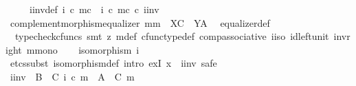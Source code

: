 \begin{isabellebody}
\ \ \ \ \ i{\isacharprime}{\kern0pt}{\isacharunderscore}{\kern0pt}inv{\isacharunderscore}{\kern0pt}def{\isacharcolon}{\kern0pt}\ {\isachardoublequoteopen}{\isacharparenleft}{\kern0pt}i\ {\isasymcirc}\isactrlsub c\ m{\isacharparenright}{\kern0pt}\isactrlsup c\ {\isacharequal}{\kern0pt}\ {\isacharparenleft}{\kern0pt}i\ {\isasymcirc}\isactrlsub c\ m\isactrlsup c{\isacharparenright}{\kern0pt}\ {\isasymcirc}\isactrlsub c\ i{\isacharprime}{\kern0pt}{\isacharunderscore}{\kern0pt}inv{\isachardoublequoteclose}\isanewline
\ \ \ \ \isamarkupfalse%
\ complement{\isacharunderscore}{\kern0pt}morphism{\isacharunderscore}{\kern0pt}equalizer{\isacharbrackleft}{\kern0pt}\ m{\isacharequal}{\kern0pt}{\isachardoublequoteopen}m{\isachardoublequoteclose}{\isacharcomma}{\kern0pt}\ \ X{\isacharequal}{\kern0pt}C{\isacharcomma}{\kern0pt}\ \ Y{\isacharequal}{\kern0pt}A{\isacharbrackright}{\kern0pt}\ \isamarkupfalse%
\ equalizer{\isacharunderscore}{\kern0pt}def\isanewline
\ \ \ \ \isamarkupfalse%
\ {\isacharparenleft}{\kern0pt}{\isacharminus}{\kern0pt}{\isacharcomma}{\kern0pt}\ typecheck{\isacharunderscore}{\kern0pt}cfuncs{\isacharcomma}{\kern0pt}\ smt\ {\isacharparenleft}{\kern0pt}z{}{\isacharparenright}{\kern0pt}\ {\isasymchi}m{\isacharunderscore}{\kern0pt}def\ cfunc{\isacharunderscore}{\kern0pt}type{\isacharunderscore}{\kern0pt}def\ comp{\isacharunderscore}{\kern0pt}associative{}\ i{\isacharunderscore}{\kern0pt}iso\ id{\isacharunderscore}{\kern0pt}left{\isacharunderscore}{\kern0pt}unit{}\ inv{\isacharunderscore}{\kern0pt}right\ m{\isacharunderscore}{\kern0pt}mono{\isacharparenright}{\kern0pt}\isanewline
\isanewline
\ \ \isamarkupfalse%
\ {\isachardoublequoteopen}isomorphism\ i{\isacharprime}{\kern0pt}{\isachardoublequoteclose}\isanewline
\ \ \isamarkupfalse%
\ {\isacharparenleft}{\kern0pt}etcs{\isacharunderscore}{\kern0pt}subst\ isomorphism{\isacharunderscore}{\kern0pt}def{}{\isacharcomma}{\kern0pt}\ intro\ exI{\isacharbrackleft}{\kern0pt}\ x\ {\isacharequal}{\kern0pt}\ {\isachardoublequoteopen}i{\isacharprime}{\kern0pt}{\isacharunderscore}{\kern0pt}inv{\isachardoublequoteclose}{\isacharbrackright}{\kern0pt}{\isacharcomma}{\kern0pt}\ safe{\isacharparenright}{\kern0pt}\isanewline
\ \ \ \ \isamarkupfalse%
\ {\isachardoublequoteopen}i{\isacharprime}{\kern0pt}{\isacharunderscore}{\kern0pt}inv\ {\isacharcolon}{\kern0pt}\ B\ {\isasymsetminus}\ {\isacharparenleft}{\kern0pt}C{\isacharcomma}{\kern0pt}\ i\ {\isasymcirc}\isactrlsub c\ m{\isacharparenright}{\kern0pt}\ {\isasymrightarrow}\ A\ {\isasymsetminus}\ {\isacharparenleft}{\kern0pt}C{\isacharcomma}{\kern0pt}\ m{\isacharparenright}{\kern0pt}{\isachardoublequoteclose}\isanewline

\end{isabellebody}
